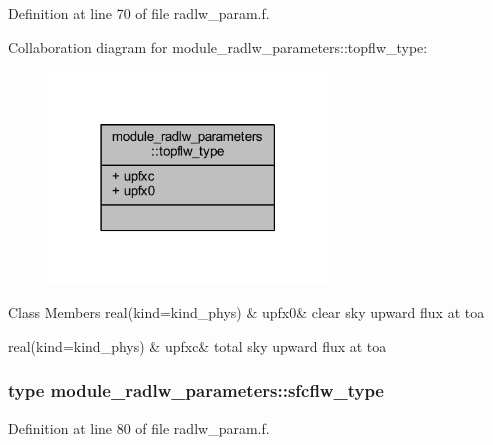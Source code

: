 Definition at line 70 of file radlw\+\_\+param.\+f.



Collaboration diagram for module\+\_\+radlw\+\_\+parameters\+:\+:topflw\+\_\+type\+:\nopagebreak
\begin{figure}[H]
\begin{center}
\leavevmode
\includegraphics[width=210pt]{structmodule__radlw__parameters_1_1topflw__type__coll__graph}
\end{center}
\end{figure}
\begin{DoxyFields}{Class Members}
real(kind=kind\+\_\+phys)\hypertarget{namespacemodule__radlw__parameters_a7080fda1f732474077aeb302b57351cb}{}\label{namespacemodule__radlw__parameters_a7080fda1f732474077aeb302b57351cb}
&
upfx0&
clear sky upward flux at toa \\
\hline

real(kind=kind\+\_\+phys)\hypertarget{namespacemodule__radlw__parameters_a19ff2669a279a1db869766c0e3d88981}{}\label{namespacemodule__radlw__parameters_a19ff2669a279a1db869766c0e3d88981}
&
upfxc&
total sky upward flux at toa \\
\hline

\end{DoxyFields}
\label{structmodule__radlw__parameters_1_1sfcflw__type}
\hypertarget{namespacemodule__radlw__parameters_structmodule__radlw__parameters_1_1sfcflw__type}{}
\subsubsection{type module\+\_\+radlw\+\_\+parameters\+:\+:sfcflw\+\_\+type}


Definition at line 80 of file radlw\+\_\+param.\+f.



